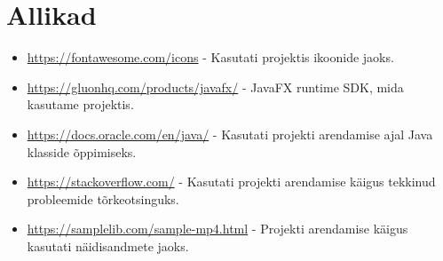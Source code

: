 \section*{Allikad}
\RaggedRight
\begin{itemize}
    \item \href{https://fontawesome.com/icons}{https://fontawesome.com/icons} - Kasutati projektis ikoonide jaoks.
    \item \href{https://gluonhq.com/products/javafx/}{https://gluonhq.com/products/javafx/} - JavaFX runtime SDK, mida kasutame projektis.
    \item \href{https://docs.oracle.com/en/java/}{https://docs.oracle.com/en/java/} - Kasutati projekti arendamise ajal Java klasside õppimiseks.
    \item \href{https://stackoverflow.com/}{https://stackoverflow.com/} - Kasutati projekti arendamise käigus tekkinud probleemide tõrkeotsinguks.
    \item \href{https://samplelib.com/sample-mp4.html}{https://samplelib.com/sample-mp4.html} - Projekti arendamise käigus kasutati näidisandmete jaoks.
\end{itemize}
